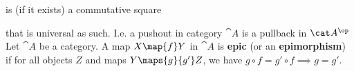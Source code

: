 is (if it exists) a commutative square %
 that is universal as such. I.e. a pushout in category $\cat A$ is a pullback in $\cat A^{\op}$
 Let $\cat A$ be a category. A map $X \map{f} Y$ in $\cat A$ is \textbf{epic} (or an \textbf{epimorphism}) if for all objects $Z$ and maps $Y \maps{g}{g'} Z$, we have
$g \circ f = g' \circ f \implies g = g'.$